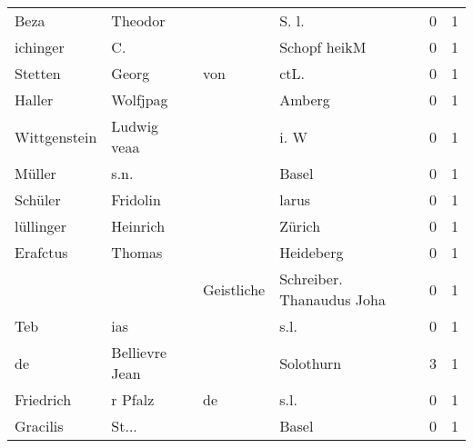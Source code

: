 \begin{tabular}{llllrr}
                     Beza &                            Theodor &             &                                      S. l.  &          0 &         1 \\
                 ichinger &                                 C. &             &                                Schopf heikM &          0 &         1 \\
                  Stetten &                              Georg &         von &                                       ctL.  &          0 &         1 \\
                   Haller &                           Wolfjpag &             &                                      Amberg &          0 &         1 \\
             Wittgenstein &                        Ludwig veaa &             &                                        i. W &          0 &         1 \\
                   Müller &                               s.n. &             &                                       Basel &          0 &         1 \\
                  Schüler &                           Fridolin &             &                                       larus &          0 &         1 \\
                lüllinger &                           Heinrich &             &                                      Zürich &          0 &         1 \\
                 Erafctus &                             Thomas &             &                                   Heideberg &          0 &         1 \\
                          &                                    &  Geistliche &                   Schreiber. Thanaudus Joha &          0 &         1 \\
                      Teb &                                ias &             &                                        s.l. &          0 &         1 \\
                       de &                     Bellievre Jean &             &                                   Solothurn &          3 &         1 \\
                Friedrich &                            r Pfalz &          de &                                        s.l. &          0 &         1 \\
                 Gracilis &                              St... &             &                                       Basel &          0 &         1 \\

\end{tabular}
